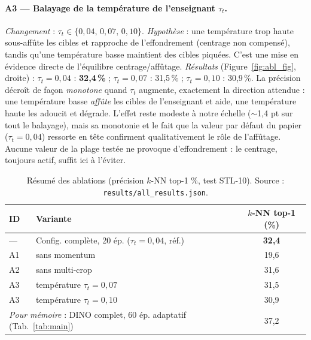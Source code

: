 \documentclass[11pt,a4paper]{article}
\begin{document}
\paragraph{A3 --- Balayage de la température de l'enseignant $\tau_t$.} \emph{Changement} :
$\tau_t \in \{0{,}04,\,0{,}07,\,0{,}10\}$. \emph{Hypothèse} : une température trop haute
sous-affûte les cibles et rapproche de l'effondrement (centrage non compensé), tandis qu'une
température basse maintient des cibles piquées. C'est une mise en évidence directe de l'équilibre
centrage/affûtage. \emph{Résultats} (Figure~\ref{fig:abl_fig}, droite) : $\tau_t{=}0{,}04$ :
\textbf{32,4\,\%} ; $\tau_t{=}0{,}07$ : 31,5\,\% ; $\tau_t{=}0{,}10$ : 30,9\,\%. La précision décroît
de façon \emph{monotone} quand $\tau_t$ augmente, exactement la direction attendue : une température
basse \emph{affûte} les cibles de l'enseignant et aide, une température haute les adoucit et dégrade.
L'effet reste modeste à notre échelle ($\sim$1,4 pt sur tout le balayage), mais sa monotonie et le
fait que la valeur par défaut du papier ($\tau_t{=}0{,}04$) ressorte en tête confirment
qualitativement le rôle de l'affûtage. Aucune valeur de la plage testée ne provoque d'effondrement :
le centrage, toujours actif, suffit ici à l'éviter.

\begin{table}[h]
\centering
\caption[Résumé des ablations]{Résumé des ablations (précision $k$-NN top-1 \%, test STL-10).
Source : \texttt{results/all\_results.json}.}
\label{tab:abl}
\begin{tabular}{llc}
\toprule
\textbf{ID} & \textbf{Variante} & \textbf{$k$-NN top-1 (\%)} \\
\midrule
--- & Config. complète, 20 ép. ($\tau_t{=}0{,}04$, réf.) & \textbf{32,4} \\
A1  & \quad sans momentum                 & 19,6 \\
A2  & \quad sans multi-crop               & 31,6 \\
A3  & \quad température $\tau_t = 0{,}07$  & 31,5 \\
A3  & \quad température $\tau_t = 0{,}10$  & 30,9 \\
\midrule
\multicolumn{2}{l}{\emph{Pour mémoire} : DINO complet, 60 ép. adaptatif (Tab.~\ref{tab:main})} & 37,2 \\
\bottomrule
\end{tabular}
\end{table}
\end{document}
